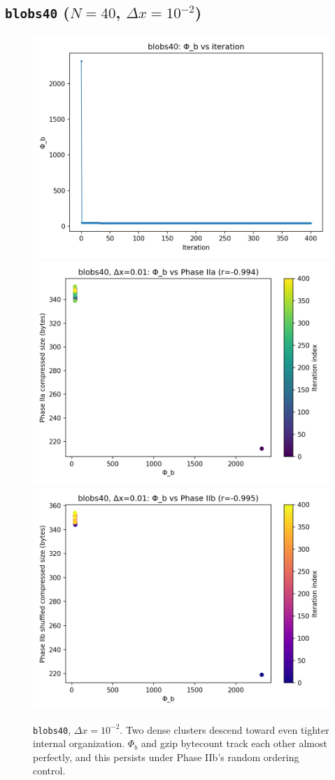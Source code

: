 \documentclass[11pt,a4paper]{article}
\newcommand{\phib}{\Phi_b}
\begin{document}
\subsection*{\texttt{blobs40} ($N{=}40$, $\Delta x = 10^{-2}$)}
\begin{figure}[htbp]
\centering
\includegraphics[width=0.32\linewidth]{figures/blobs40_dx0.01_phib_vs_iter.png}
\includegraphics[width=0.32\linewidth]{figures/blobs40_dx0.01_phib_vs_phase2a.png}
\includegraphics[width=0.32\linewidth]{figures/blobs40_dx0.01_phib_vs_phase2b.png}
\caption{\texttt{blobs40}, $\Delta x{=}10^{-2}$. Two dense clusters descend toward even tighter internal organization. $\phib$ and gzip bytecount track each other almost perfectly, and this persists under Phase IIb's random ordering control.}
\label{fig:blobs40}
\end{figure}
\end{document}
